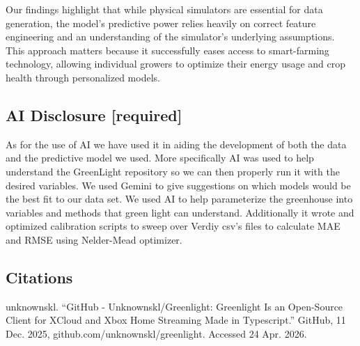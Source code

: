 \documentclass{article}
\begin{document}
Our findings highlight that while physical simulators are essential for data generation, the model's predictive power relies heavily on correct feature engineering and an understanding of the simulator's underlying assumptions. This approach matters because it successfully eases access to smart-farming technology, allowing individual growers to optimize their energy usage and crop health through personalized models.

\subsection*{AI Disclosure [required]}

As for the use of AI we have used it in aiding the development of both the data and the predictive model we used. More specifically AI was used to help understand the GreenLight repository so we can then properly run it with the desired variables. We used Gemini to give suggestions on which models would be the best fit to our data set. We used AI to help parameterize the greenhouse into variables and methods that green light can understand. Additionally it wrote and optimized calibration scripts to sweep over Verdiy csv's files to calculate MAE and RMSE using Nelder-Mead optimizer.



\subsection{Citations}
                              
unknownskl. “GitHub - Unknownskl/Greenlight: Greenlight Is an Open-Source Client for XCloud and Xbox Home Streaming Made in Typescript.” GitHub, 11 Dec. 2025, github.com/unknownskl/greenlight. Accessed 24 Apr. 2026.


    
\end{document}
